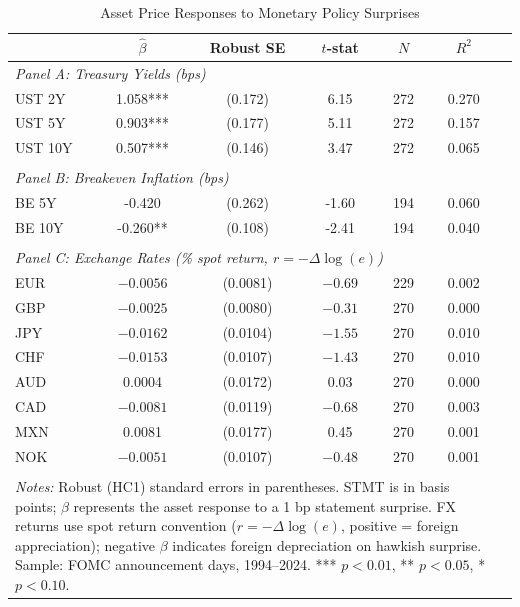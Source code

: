\begin{table}[htbp]
\centering
\caption{Asset Price Responses to Monetary Policy Surprises}
\label{tab:responses}
\begin{tabular}{lcccccc}
\hline\hline
 & $\hat{\beta}$ & Robust SE & $t$-stat & $N$ & $R^2$ \\
\hline
\multicolumn{6}{l}{\textit{Panel A: Treasury Yields (bps)}} \\[2pt]
\quad UST 2Y & 1.058*** & (0.172) & 6.15 & 272 & 0.270 \\
\quad UST 5Y & 0.903*** & (0.177) & 5.11 & 272 & 0.157 \\
\quad UST 10Y & 0.507*** & (0.146) & 3.47 & 272 & 0.065 \\
\\
\multicolumn{6}{l}{\textit{Panel B: Breakeven Inflation (bps)}} \\[2pt]
\quad BE 5Y & -0.420 & (0.262) & -1.60 & 194 & 0.060 \\
\quad BE 10Y & -0.260** & (0.108) & -2.41 & 194 & 0.040 \\
\\
\multicolumn{6}{l}{\textit{Panel C: Exchange Rates (\% spot return, $r = -\Delta\log(e)$)}} \\[2pt]
\quad EUR & $-0.0056$ & (0.0081) & $-0.69$ & 229 & 0.002 \\
\quad GBP & $-0.0025$ & (0.0080) & $-0.31$ & 270 & 0.000 \\
\quad JPY & $-0.0162$ & (0.0104) & $-1.55$ & 270 & 0.010 \\
\quad CHF & $-0.0153$ & (0.0107) & $-1.43$ & 270 & 0.010 \\
\quad AUD & 0.0004 & (0.0172) & 0.03 & 270 & 0.000 \\
\quad CAD & $-0.0081$ & (0.0119) & $-0.68$ & 270 & 0.003 \\
\quad MXN & 0.0081 & (0.0177) & 0.45 & 270 & 0.001 \\
\quad NOK & $-0.0051$ & (0.0107) & $-0.48$ & 270 & 0.001 \\
\\
\hline
\multicolumn{6}{p{11cm}}{\footnotesize \textit{Notes:} Robust (HC1) standard errors in parentheses. STMT is in basis points; $\beta$ represents the asset response to a 1 bp statement surprise. FX returns use spot return convention ($r = -\Delta\log(e)$, positive = foreign appreciation); negative $\beta$ indicates foreign depreciation on hawkish surprise. Sample: FOMC announcement days, 1994--2024. *** $p<0.01$, ** $p<0.05$, * $p<0.10$.} \\
\end{tabular}
\end{table}